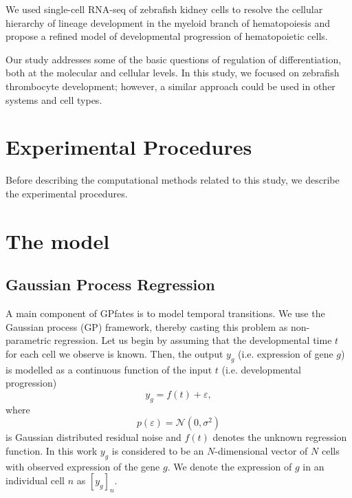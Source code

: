 We used single-cell RNA-seq of zebrafish kidney cells to resolve the cellular hierarchy of lineage development in the myeloid branch of hematopoiesis and propose a refined model of developmental progression of hematopoietic cells.

Our study addresses some of the basic questions of regulation of differentiation, both at the molecular and cellular levels. In this study, we focused on zebrafish thrombocyte development; however, a similar approach could be used in other systems and cell types.

\section{Experimental Procedures}

Before describing the computational methods related to this study, we describe the experimental procedures.

\section{The  model}

\subsection{Gaussian Process Regression}

A main component of GPfates is to model temporal transitions.  We use the Gaussian process (GP) framework, thereby casting this problem as non-parametric regression. Let us begin by assuming that the developmental time $ t $ for each cell we observe is known. Then, the output $ y_g $ (i.e. expression of gene $ g $) is modelled as a continuous function of the input $ t $ (i.e. developmental progression)
\begin{equation}
\label{eq:gpregression}
y_g = f(t) + \varepsilon,
\end{equation}
where
$$ p(\varepsilon) = \mathcal{N}(0, \sigma^2) $$ is Gaussian distributed residual noise and $ f(t) $ denotes the unknown regression function. In this work $ y_g $ is considered to be an $ N $-dimensional vector of $ N $ cells with observed expression of the gene $ g $. We denote the expression of $ g $ in an individual cell $ n $ as $ [y_g]_n $.

